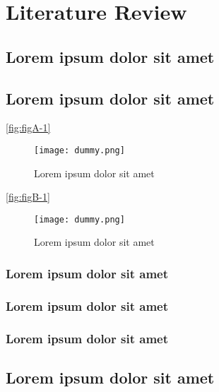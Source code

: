 \chapter{Literature Review}

\section{Lorem ipsum dolor sit amet}

\lipsum[1-3]

\section{Lorem ipsum dolor sit amet}

\lipsum[1-1] \ref{fig:figA-1}

\begin{figure}[H]
    \centering
    \texttt{[image: dummy.png]}
    \caption{Lorem ipsum dolor sit amet}
    \label{fig:figA-2}
\end{figure}

\lipsum[1-1] \ref{fig:figB-1}

\begin{figure}[H]
    \centering
    \texttt{[image: dummy.png]}
    \caption{Lorem ipsum dolor sit amet}
    \label{fig:figB-2}
\end{figure}

\subsection{Lorem ipsum dolor sit amet}

\lipsum[1-1] \cite{reference-1}

\subsection{Lorem ipsum dolor sit amet}

\lipsum[1-1] \cite{reference-2}

\subsection{Lorem ipsum dolor sit amet}

\lipsum[1-1] \cite{reference-3}

\section{Lorem ipsum dolor sit amet}

